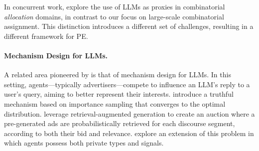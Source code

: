 In concurrent work, \citet{Huang25Accelerated} explore the use of LLMs as proxies in combinatorial \textit{allocation} domains, in contrast to our focus on large-scale combinatorial assignment. This distinction introduces a different set of challenges, resulting in a different framework for PE.

\paragraph{Mechanism Design for LLMs.}
A related area pioneered by \citet{duetting2024mdforllms} is that of mechanism design for LLMs.
In this setting, agents---typically advertisers---compete to influence an LLM's reply to a user's query, aiming to better represent their interests.
\citet{soumalias2024truthful} introduce a truthful mechanism based on importance sampling that converges to the optimal distribution. 
\citet{mohammad2024rag} leverage retrieval-augmented generation to create an auction where a pre-generated ads are probabilistically retrieved for each discourse segment, according to both their bid and relevance. 
\citet{bergemann2024datadrivenmd} explore an extension of this problem in which agents possess both private types and signals.